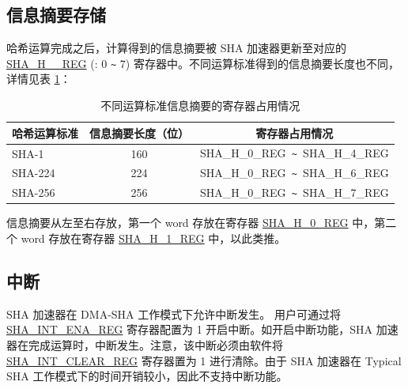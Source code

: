 \documentclass[main\_\_CN.tex]{subfiles}
\begin{document}

\subsection{信息摘要存储}

哈希运算完成之后，计算得到的信息摘要被 SHA 加速器更新至对应的 \hyperref[regdesc:SHAHNREG]{SHA\_H\_\_REG} (: 0 \verb+~+ 7) 寄存器中。不同运算标准得到的信息摘要长度也不同，详情见表 \ref{tab:sha-message-digest}：


\begin{table}[H]
    \centering
    \caption{不同运算标准信息摘要的寄存器占用情况}
    \label{tab:sha-message-digest}
    \begin{threeparttable}
    \begin{tabular}{ | l | c | c |}
    \hline
        \rowcolor{lightgray}
        \textbf{哈希运算标准} & \textbf{信息摘要长度（位）} & \textbf{寄存器占用情况\tnote{1}} \\\hline
        SHA-1 & 160 & SHA\_H\_0\_REG\verb+ ~ +SHA\_H\_4\_REG \\\hline
        SHA-224 & 224 & SHA\_H\_0\_REG\verb+ ~ +SHA\_H\_6\_REG \\\hline  
        SHA-256 & 256 & SHA\_H\_0\_REG\verb+ ~ +SHA\_H\_7\_REG \\\hline
    \end{tabular}

    \begin{tablenotes}
        \item[1] 信息摘要从左至右存放，第一个 word 存放在寄存器 \hyperref[regdesc:SHAHNREG]{SHA\_H\_0\_REG} 中，第二个 word 存放在寄存器 \hyperref[regdesc:SHAHNREG]{SHA\_H\_1\_REG} 中，以此类推。
    \end{tablenotes}

    \end{threeparttable}
\end{table}

\subsection{中断}\label{sec:sha-Interrupt}

SHA 加速器在 DMA-SHA 工作模式下允许中断发生。
 用户可通过将 \hyperref[regdesc:SHAINTENAREG]{SHA\_INT\_ENA\_REG} 寄存器配置为 1 开启中断。如开启中断功能，SHA 加速器在完成运算时，中断发生。注意，该中断必须由软件将 \hyperref[regdesc:SHAINTCLEARREG]{SHA\_INT\_CLEAR\_REG} 寄存器置为 1 进行清除。由于 SHA 加速器在 Typical SHA 工作模式下的时间开销较小，因此不支持中断功能。
\end{document}
